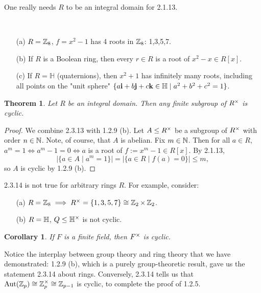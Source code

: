 \documentclass[11pt]{book}
\newcounter{counter}
\newtheorem{theorem}[counter]{Theorem}   \newtheorem*{theorem*}{Theorem}   \newtheorem{lemma}[counter]{Lemma}   \newtheorem{corollary}[counter]{Corollary}
\theoremstyle{definition}   \newtheorem{defn}[counter]{Definition} %
\newcommand{\vs}{\vspace{8pt}}
\numberwithin{counter}{chapter}
\begin{document}
\vs

\begin{remark*}
One really needs $R$ to be an integral domain for 2.1.13.
\begin{example*}
\
\begin{enumerate}
\item[(a)] $R = \operatorname{\mathbb{Z}}_8$, $f = x^2-1$ has 4 roots in $\operatorname{\mathbb{Z}}_8$: 1,3,5,7.
\item[(b)] If $R$ is a Boolean ring, then every $r \in R$ is a root of $x^2-x \in R[x]$.
\item[(c)] If $R = \mathbb{H}$ (quaternions), then $x^2+1$ has infinitely many roots, including all points on the "unit sphere" $\{a\mathbf{i}+b\mathbf{j}+c\mathbf{k} \in \mathbb{H} \mid a^2+b^2+c^2=1\}$.
\end{enumerate}
\end{example*}
\end{remark*}

\vs

\begin{theorem}
Let $R$ be an integral domain. Then any finite subgroup of $R^{\times}$ is cyclic.
\end{theorem}

\begin{proof}
We combine 2.3.13 with 1.2.9 (b). Let $A \leq R^{\times}$ be a subgroup of $R^{\times}$ with order $n \in \operatorname{\mathbb{N}}$. Note, of course, that $A$ is abelian. Fix $m \in \operatorname{\mathbb{N}}$. Then for all $a \in R$, $a^m = 1 \iff a^m-1=0 \iff a$ is a root of $f := x^m-1\in R[x]$. By 2.1.13,
	\[|\{a \in A \mid a^m=1\}| = |\{a \in R \mid f(a)=0\}| \leq m, \]
so $A$ is cyclic by 1.2.9 (b).
\end{proof}

\vs

\begin{remark*}
2.3.14 is not true for arbitrary rings $R$. For example, consider:
\begin{enumerate}
\item[(a)] $R = \operatorname{\mathbb{Z}}_8 \implies R^{\times} = \{1,3,5,7\} \cong \operatorname{\mathbb{Z}}_2 \times \operatorname{\mathbb{Z}}_2$.
\item[(b)] $R = \mathbb{H}$, $Q \leq \mathbb{H}^{\times}$ is not cyclic.
\end{enumerate}
\end{remark*}

\vs

\begin{corollary}
If $F$ is a finite field, then $F^{\times}$ is cyclic.
\end{corollary}

\vs

\begin{remark*}
Notice the interplay between group theory and ring theory that we have demonstrated: 1.2.9 (b), which is a purely group-theoretic result, gave us the statement 2.3.14 about rings. Conversely, 2.3.14 tells us that $\operatorname{\textnormal{Aut}}(\operatorname{\mathbb{Z}}_p) \cong \operatorname{\mathbb{Z}}_p^{\times} \cong \operatorname{\mathbb{Z}}_{p-1}$ is cyclic, to complete the proof of 1.2.5.
\end{remark*}
\end{document}
